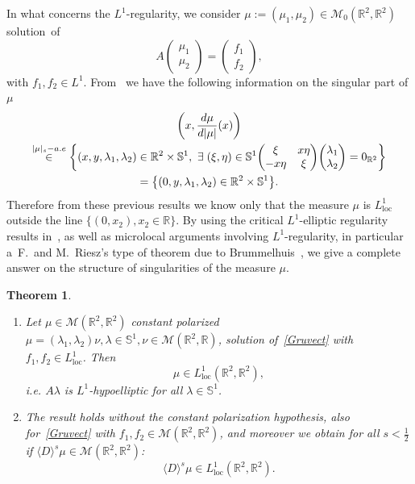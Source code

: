 \documentclass[10pt]{amsart}
\newtheorem{theo}{Theorem}[section]
\theoremstyle{definition}\newtheorem{defi}[theo]{Definition}\newtheorem{rema}[theo]{Remark}\newtheorem{exam}[theo]{Example}\newtheorem{exem}[theo]{Example}\newtheorem{nota}[theo]{Notation}
\DeclareMathOperator{\locc}{loc}
\newcommand{\bbR}{\mathbb{R}}
\newcommand{\bbS}{\mathbb{S}}
\newcommand{\clM}{\mathcal{M}}
\let\originalleft\left
\let\originalright\right
\renewcommand{\left}{\mathopen{}\mathclose\bgroup\originalleft}
\renewcommand{\right}{\aftergroup\egroup\originalright}
\newcommand*{\relabel}{\renewcommand{\labelenumi}{(\theenumi)}}
\newcommand*{\romanenumi}{\renewcommand*{\theenumi}{\roman{enumi}}\relabel}
\let\oldexists\exists
\renewcommand*{\exists}{\mathrel{\oldexists}}
\begin{document}
In what concerns the $L^1$-regularity, we consider $\mu:=(\mu_1,\mu_2)\in \clM_0(\bbR^2,\bbR^2)$ solution~of
\begin{equation}\label{Gruvect}
A
\begin{pmatrix}
\mu_1\\ \mu_2
\end{pmatrix}
=
\begin{pmatrix}
f_1\\ f_2
\end{pmatrix},
\end{equation}
with $f_1,f_2\in L^1$. From~\cite{DePRi} we have the following information on the singular part of $\mu$
\begin{multline*}
\left(x,\frac{d\mu}{d|\mu|}(x)\right)\\
\overset{|\mu|_s-a.e}{\in}\left\{(x,y,\lambda_1,\lambda_2)\in\bbR^2\times \bbS^1,\ \exists (\xi,\eta)\in\bbS^1
\begin{pmatrix}
\xi & x\eta\\ -x\eta & \xi
\end{pmatrix}
\begin{pmatrix}
\lambda_1\\ \lambda_2
\end{pmatrix}
=0_{\bbR^2}\right\}\\
=\left\{(0,y,\lambda_1,\lambda_2)\in\bbR^2\times \bbS^1\right\}.
\end{multline*}
Therefore from these previous results we know only that the measure $\mu$ is $L^1_{\locc}$ outside the line $\{(0,x_2), x_2\in\bbR\}$. By using the critical $L^1$-elliptic regularity results in~\cite{BBWFL1}, as well as microlocal arguments involving $L^1$-regularity, in particular a~F.~and M.~Riesz's type of theorem due to Brummelhuis~\cite{Br}, we give a complete answer on the structure of singularities of the measure $\mu$.




\begin{theo}\leavevmode
\label{thvectL1}
\begin{enumerate}\romanenumi
\item\label{theo1.4.1}%
\!\!
Let $\mu\!\in\! \clM(\bbR^2,\bbR^2)$ constant polarized $\mu=(\lambda_1,\lambda_2)\nu, \lambda\in\bbS^1,\nu\!\in\! \clM(\bbR^2,\bbR)$, solution of~\eqref{Gruvect} with $f_1,f_2\in L^1_{\locc}$. Then
\[
\mu\in L^1_{\locc}(\bbR^2,\bbR^2),
\]
i.e. $A\lambda$ is $L^1$-hypoelliptic for all $\lambda\in\bbS^1$.


\item\label{theo1.4.2} The result holds without the constant polarization hypothesis, also for~\eqref{Gruvect} with $f_1,f_2 \in \clM(\bbR^2,\bbR^2)$, and moreover we obtain for all $s<\frac 12$ if $\langle D\rangle^{s}\mu\in \clM(\bbR^2,\bbR^2)$:
\[
\langle D\rangle^{s}\mu\in L^1_{\locc}(\bbR^2,\bbR^2).
\]
\end{enumerate}
\end{theo}
\end{document}
